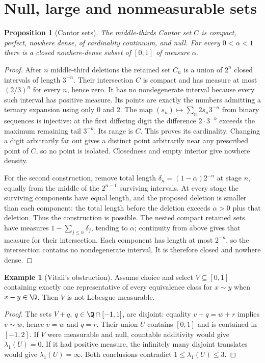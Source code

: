 \documentclass[11pt,oneside,openany]{book}
\newtheorem{proposition}[theorem]{Proposition}
\theoremstyle{definition}
\newtheorem{example}[theorem]{Example}
\theoremstyle{remark}
\newcommand{\family}[1]{}
\begin{document}
\section{Null, large and nonmeasurable sets}

\begin{proposition}[Cantor sets]
\family{D11.03.cantor_null_uncountable}\label{d11:03:cantor-null-uncountable}
The middle-thirds Cantor set $C$ is compact, perfect, nowhere dense,
of cardinality continuum, and null. For every $0<\alpha<1$ there is a
closed nowhere-dense subset of $[0,1]$ of measure $\alpha$.
\end{proposition}
\begin{proof}
After $n$ middle-third deletions the retained set $C_n$ is a union of
$2^n$ closed intervals of length $3^{-n}$. Their intersection $C$ is compact
and has measure at most $(2/3)^n$ for every $n$, hence zero. It has no
nondegenerate interval because every such interval has positive measure.
Its points are exactly the numbers admitting a ternary expansion using
only $0$ and $2$. The map
$(s_n)\mapsto\sum_n2s_n3^{-n}$ from binary sequences is injective: at the
first differing digit the difference $2\cdot3^{-k}$ exceeds the maximum
remaining tail $3^{-k}$. Its range is $C$. This proves its cardinality.
Changing a digit arbitrarily far out gives a distinct point arbitrarily
near any prescribed point of $C$, so no point is isolated. Closedness and
empty interior give nowhere density.

For the second construction, remove total length
$\delta_n=(1-\alpha)2^{-n}$ at stage $n$, equally from the middle of the
$2^{n-1}$ surviving intervals. At every stage the surviving components
have equal length, and the proposed deletion is smaller than each component:
the total length before the deletion exceeds $\alpha>0$ plus that deletion.
Thus the construction is possible. The nested compact retained sets have
measures $1-\sum_{j\leq n}\delta_j$, tending to $\alpha$; continuity from
above gives that measure for their intersection. Each component has length
at most $2^{-n}$, so the intersection contains no nondegenerate interval.
It is therefore closed and nowhere dense.
\end{proof}

\begin{example}[Vitali's obstruction]
\family{D11.03.vitali_nonmeasurable}\label{d11:03:vitali-nonmeasurable}
Assume choice and select $V\subseteq[0,1]$ containing exactly one
representative of every equivalence class for $x\sim y$ when $x-y\in\Q$.
Then $V$ is not Lebesgue measurable.
\end{example}
\begin{proof}
The sets $V+q$, $q\in\Q\cap[-1,1]$, are disjoint: equality
$v+q=w+r$ implies $v\sim w$, hence $v=w$ and $q=r$.
Their union $U$ contains $[0,1]$ and is contained in $[-1,2]$.
If $V$ were measurable and null, countable additivity would give
$\lambda_1(U)=0$. If it had positive measure, the infinitely many disjoint
translates would give $\lambda_1(U)=\infty$. Both conclusions contradict
$1\leq\lambda_1(U)\leq3$.
\end{proof}
\end{document}
